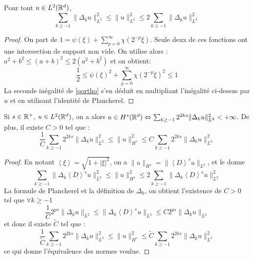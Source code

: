 \documentclass[11pt,a4paper]{article}
\begin{document}
\begin{lemma}\label{lqortho}
Pour tout $u\in L^2(\mathbb R^d)$, 
\begin{equation}\label{qortho}
\sum_{k \geq -1} \|\Delta_k u \|^2_{L^2} \leq \| u \|^2_{L^2} \leq 2 \sum_{k \geq -1} \|\Delta_k u \|^2_{L^2} 
\end{equation}
\end{lemma}

\begin{proof}
On part de $1= \psi(\xi) + \sum_{p=0}^\infty \chi(2^{-p} \xi)$.
Seule deux de ces fonctions ont une intersection de support non vide. On utilise alors : $a^2 +b^2 \leq (a+b)^2 \leq 2(a^2 +b^2)$ et on obtient:
$$ \frac{1}{2} \leq \psi(\xi)^2 + \sum_{p=0}^\infty \chi(2^{-p} \xi)^2 \leq 1$$
La seconde inégalité de \eqref{qortho} s'en déduit en multipliant l'inégalité ci-dessus par $\hat{u}$ et en utilisant l'identité de Plancherel.
\end{proof}

\begin{prop}\label{prop_carac_sobolev}
Si $s\in \mathbb R^+$, $u\in L^2(\mathbb R^d)$, on a alors $u\in H^s(\mathbb R^d) \Leftrightarrow \sum_{k\geq -1}2^{2ks}\|\Delta_k u \|_{L^2}^2 < +\infty$. De plus, il existe $C>0$ tel que :
\begin{equation}\label{carac_sobol}
\frac{1}{C}\sum_{k\geq -1}2^{2ks}\|\Delta_k u \|_{L^2}^2 \leq \|u\|_{H^s}^2 \leq C \sum_{k\geq -1}2^{2ks}\|\Delta_k u \|_{L^2}^2 
\end{equation}
\end{prop}

\begin{proof}
En notant $\left\langle \xi \right\rangle = \sqrt{1 + |\xi|^2}$, on a $\|u\|_{H^s} = \|\left\langle D \right\rangle^su\|_{L^2}$, et le  donne 
\[\sum_{k \geq -1} \|\Delta_k \left\langle D \right\rangle^su \|^2_{L^2} \leq \| u \|^2_{H^s} \leq 2 \sum_{k \geq -1} \|\Delta_k \left\langle D \right\rangle^su \|^2_{L^2} \]
La formule de Plancherel et la définition de $\Delta_k$, on obtient l'existence de $C>0$ tel que $\forall k \geq -1$
\[\frac{1}{C}2^{ps}\|\Delta_ku\|_{L^2} \leq  \|\Delta_k\left\langle D \right\rangle^su\|_{L^2} \leq C2^{ps}\|\Delta_ku\|_{L^2} \]
et donc il existe $\tilde{C}$ tel que :
\[
\frac{1}{\tilde{C}}\sum_{k\geq -1}2^{2ks}\|\Delta_k u \|_{L^2}^2 \leq \|u\|_{H^s}^2 \leq \tilde{C} \sum_{k\geq -1}2^{2ks}\|\Delta_k u \|_{L^2}^2 \]
ce qui donne l'équivalence des normes voulue.
\end{proof}
\end{document}
